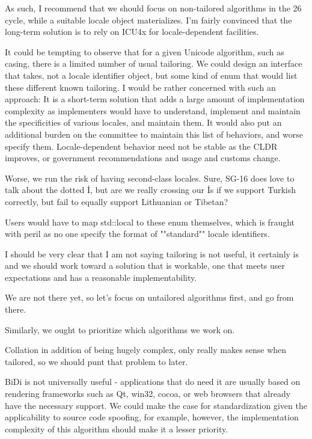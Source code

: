 \documentclass{wg21}
\begin{document}
As such, I recommend that we should focus on non-tailored algorithms in the 26 cycle, while a suitable locale object materializes.
I'm fairly convinced that the long-term solution is to rely on ICU4x for locale-dependent facilities.

It could be tempting to observe that for a given Unicode algorithm, such as casing, there is a limited number of usual tailoring.
We could design an interface that takes, not a locale identifier object, but some kind of enum that would list these different known tailoring.
I would be rather concerned with such an approach: It is a short-term solution that adds a large amount of implementation complexity as implementers would have to understand, implement and maintain the specificities of various locales, and maintain them.
It would also put an additional burden on the committee to maintain this list of behaviors, and worse specify them. Locale-dependent behavior need not be stable as
the CLDR improves, or government recommendations and usage and customs change.

Worse, we run the risk of having second-class locales. Sure, SG-16 does love to talk about the dotted İ, but are we really crossing our İs if we support Turkish correctly, but fail to equally support Lithuanian or Tibetan?

Users would have to map std::local to these enum themselves, which is fraught with peril as no one specify the format of ""standard"" locale identifiers.

I should be very clear that I am not saying tailoring is not useful, it certainly is and we should work toward a solution that is workable, one that meets user expectations and has a reasonable implementability.

We are not there yet, so let's focus on untailored algorithms first, and go from there.

Similarly, we ought to prioritize which algorithms we work on.

Collation in addition of being hugely complex, only really makes sense when tailored, so we should punt that problem to later.

BiDi is not universally useful - applications that do need it are usually based on rendering frameworks such as Qt, win32, cocoa, or web browsers that already have the necessary support.
We could make the case for standardization given the applicability to source code spoofing, for example, however, the implementation complexity of this algorithm should make it a lesser priority.
\end{document}
